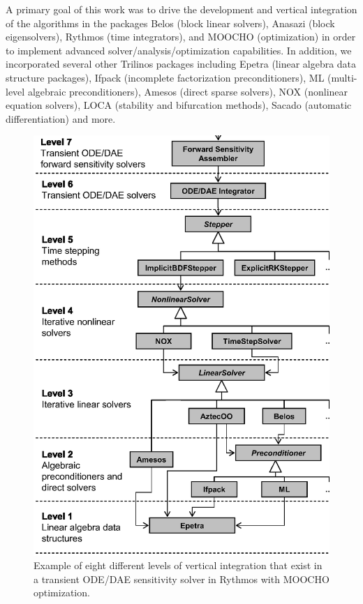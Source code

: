 \documentclass[pdf,ps2pdf,11pt]{SANDreport}
\begin{document}
A primary goal of this work was to drive the development and vertical
integration of the algorithms in the packages Belos (block linear solvers),
Anasazi (block eigensolvers), Rythmos (time integrators), and MOOCHO
(optimization) in order to implement advanced solver/analysis/optimization
capabilities.  In addition, we incorporated several other Trilinos packages
including Epetra (linear algebra data structure packages), Ifpack (incomplete
factorization preconditioners), ML (multi-level algebraic preconditioners),
Amesos (direct sparse solvers), NOX (nonlinear equation solvers), LOCA
(stability and bifurcation methods), Sacado (automatic differentiation) and
more.

{\bsinglespace
\begin{figure}[p]
\begin{center}
\includegraphics*[angle=0,scale=0.85]{VerticalPackageIntegration}
\end{center}
\caption[Eight different levels of vertical integration in modular
transient sensitivity solver and optimizer] {
\label{fig:VerticalPackageIntegration}
Example of eight different levels of vertical integration that exist in a
transient ODE/DAE sensitivity solver in Rythmos with MOOCHO optimization.}
\end{figure}
\esinglespace}
\end{document}
